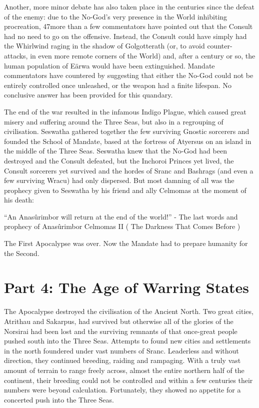 \documentclass[]{book}
\begin{document}
Another, more minor debate has also taken place in the centuries since the defeat of
the enemy: due to the No-God's very presence in the World inhibiting procreation,
47more than a few commentators have pointed out that the Consult had no need to go
on the offensive. Instead, the Consult could have simply had the Whirlwind raging in
the shadow of Golgotterath (or, to avoid counter-attacks, in even more remote corners
of the World) and, after a century or so, the human population of Eärwa would have
been extinguished. Mandate commentators have countered by suggesting that either the
No-God could not be entirely controlled once unleashed, or the weapon had a finite
lifespan. No conclusive answer has been provided for this quandary.

The end of the war resulted in the infamous Indigo Plague, which caused great misery
and suffering around the Three Seas, but also in a regrouping of civilisation. Seswatha
gathered together the few surviving Gnostic sorcerers and founded the School of
Mandate, based at the fortress of Atyersus on an island in the middle of the Three Seas.
Seswatha knew that the No-God had been destroyed and the Consult defeated, but the
Inchoroi Princes yet lived, the Consult sorcerers yet survived and the hordes of Sranc
and Bashrags (and even a few surviving Wracu) had only dispersed. But most damning
of all was the prophecy given to Seswatha by his friend and ally Celmomas at the
moment of his death:

``An Anasûrimbor will return at the end of the world!'' - The last words and prophecy of
Anasûrimbor Celmomas II ( The Darkness That Comes Before )

The First Apocalypse was over. Now the Mandate had to prepare humanity for the Second.

\hypertarget{part-4-the-age-of-warring-states}{%
\chapter{Part 4: The Age of Warring States}\label{part-4-the-age-of-warring-states}}

The Apocalypse destroyed the civilisation of the Ancient North. Two great cities,
Atrithau and Sakarpus, had survived but otherwise all of the glories of the Norsirai had
been lost and the surviving remnants of that once-great people pushed south into the
Three Seas. Attempts to found new cities and settlements in the north foundered
under vast numbers of Sranc. Leaderless and without direction, they continued
breeding, raiding and rampaging. With a truly vast amount of terrain to range freely
across, almost the entire northern half of the continent, their breeding could not be
controlled and within a few centuries their numbers were beyond calculation.
Fortunately, they showed no appetite for a concerted push into the Three Seas.
\end{document}
